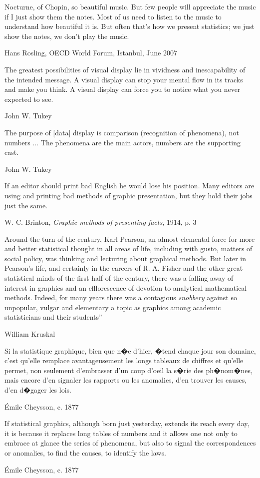 \epigraph{Nocturne, of Chopin, so beautiful music. But few people will appreciate the music if I just show them the notes. Most of us need to listen to the music to understand how beautiful it is. But often that's how we present statistics; we just show the notes, we don't play the music.}{Hans Rosling, OECD World Forum, Istanbul, June 2007}

\epigraph{The greatest possibilities of visual display lie in vividness and inescapability of the intended message. A visual display can stop your mental flow in its tracks and make you think. A visual display can force you to notice what you never expected to see.}{John W. Tukey \citeyear{Tukey:90}}

\epigraph{The purpose of [data] display is comparison (recognition of phenomena), not numbers ... The phenomena are the main actors, numbers are the supporting cast.}{John W. Tukey \citeyear{Tukey:90}}

\epigraph{If an editor should print bad English he would lose his position. Many editors are using and printing bad methods of graphic presentation, but they hold their jobs just the same.}{W. C. Brinton, \emph{Graphic methods of presenting facts}, 1914, p. 3}

\epigraph{Around the turn of the century, Karl Pearson, an almost elemental force for more and better statistical thought in all areas of life, including with gusto, matters of social policy, was thinking and lecturing about graphical methods. But later in Pearson's life, and certainly in the careers of R. A. Fisher and the other great statistical minds of the first half of the century, there was a falling away of interest in graphics and an efflorescence  of devotion to analytical mathematical methods. Indeed, for many years there was a contagious \emph{snobbery} against so unpopular, vulgar and elementary a topic as graphics among academic statisticians and their students''}{William Kruskal \citep[p. 144, italics in original]{Kruskal:1978}}



\epigraph{Si la statistique  graphique, bien que  n�e d'hier, �tend  chaque jour son  domaine,  c'est  qu'elle remplace  avantageusement  les  longs tableaux  de chiffres et qu'elle permet, non seulement d'embrasser d'un coup d'oeil la  s�rie des ph�nom�nes, mais  encore d'en signaler  les rapports ou  les anomalies, d'en trouver les causes, d'en d�gager les lois.}{\'Emile Cheysson, c. 1877} 

\epigraph{If statistical graphics, although born just yesterday, extends its reach every day, it is because it replaces long tables of numbers and it allows one not only to embrace at glance the series of phenomena, but also to signal the correspondences or anomalies, to find the causes, to identify the laws.}{\'Emile Cheysson, c. 1877}

